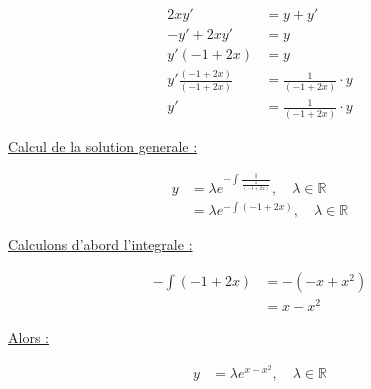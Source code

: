 \begin{align*}
    2xy' &= y + y' \\
    -y' + 2xy' &= y \\
    y'(-1 + 2x) &= y \\
    y' \frac{(-1 + 2x)}{(-1 + 2x)} &= \frac{1}{(-1 + 2x)} \cdot y \\
    y' &= \frac{1}{(-1 + 2x)} \cdot y
\end{align*}

\underline{Calcul de la solution generale :}

\begin{align*}
    y &= \lambda e^{-\int\frac{1}{\frac{1}{(-1+2x)}}},\quad \lambda \in \mathbb{R} \\
    &= \lambda e^{-\int (-1 + 2x)},\quad \lambda \in \mathbb{R}
\end{align*}

\underline{Calculons d'abord l'integrale :}

\begin{align*}
    -\int (-1 + 2x) &= -(-x + x^2) \\
    &= x - x^2
\end{align*}

\underline{Alors :}

\begin{align*}
    y &= \lambda e^{x - x^2},\quad \lambda \in \mathbb{R}
\end{align*}

